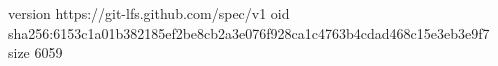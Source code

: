version https://git-lfs.github.com/spec/v1
oid sha256:6153c1a01b382185ef2be8cb2a3e076f928ca1c4763b4cdad468c15e3eb3e9f7
size 6059
